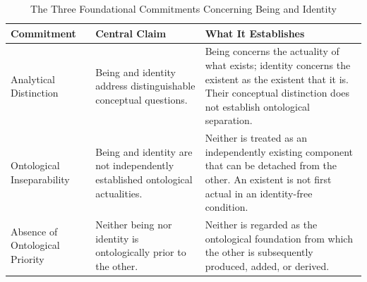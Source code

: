 %
%
%
%

\begin{table}[htbp]
\centering
\caption{The Three Foundational Commitments Concerning Being and Identity}
\label{tab:being-identity-foundational-commitments}

\renewcommand{\arraystretch}{1.4}
\small

\begin{tabular}{|p{}|p{}|p{}|}
\hline
\textbf{Commitment}
&
\textbf{Central Claim}
&
\textbf{What It Establishes}
\\
\hline

Analytical Distinction
&
Being and identity address distinguishable
conceptual questions.
&
Being concerns the actuality of what exists;
identity concerns the existent as the existent
that it is. Their conceptual distinction
does not establish ontological separation.
\\
\hline

Ontological Inseparability
&
Being and identity are not independently
established ontological actualities.
&
Neither is treated as an independently
existing component that can be detached
from the other. An existent is not first
actual in an identity-free condition.
\\
\hline

Absence of Ontological Priority
&
Neither being nor identity is ontologically
prior to the other.
&
Neither is regarded as the ontological
foundation from which the other is
subsequently produced, added, or derived.
\\
\hline

\end{tabular}

\end{table}

